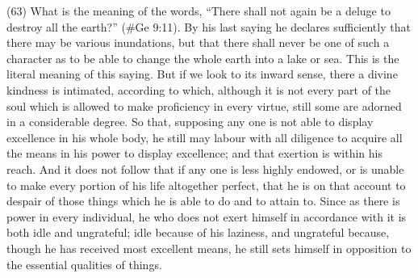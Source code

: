 (63) What is the meaning of the words, ``There shall not again be a deluge to destroy all the earth?''
(\#Ge 9:11). By his last saying he declares sufficiently that there may be various inundations,
but that there shall never be one of such a character as to be able to change the whole earth into a
lake or sea. This is the literal meaning of this saying. But if we look to its inward sense, there a
divine kindness is intimated, according to which, although it is not every part of the soul which is
allowed to make proficiency in every virtue, still some are adorned in a considerable degree. So
that, supposing any one is not able to display excellence in his whole body, he still may labour with
all diligence to acquire all the means in his power to display excellence; and that exertion is within
his reach. And it does not follow that if any one is less highly endowed, or is unable to make every
portion of his life altogether perfect, that he is on that account to despair of those things which he
is able to do and to attain to. Since as there is power in every individual, he who does not exert
himself in accordance with it is both idle and ungrateful; idle because of his laziness, and ungrateful
because, though he has received most excellent means, he still sets himself in opposition to the
essential qualities of things.

